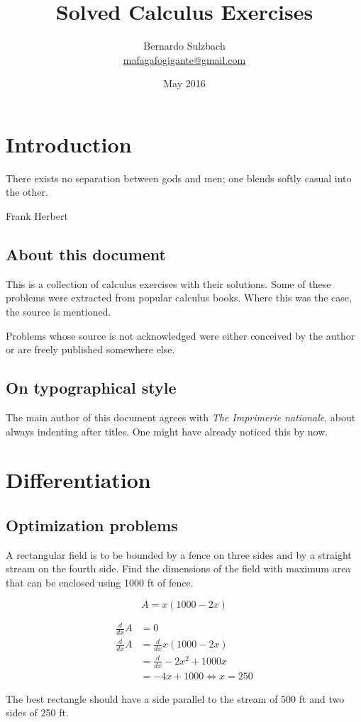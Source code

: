 \documentclass[a4paper, titlepage]{article}
\title{Solved Calculus Exercises}
\author{Bernardo Sulzbach \\
       \href{mailto:mafagafogigante@gmail.com}{mafagafogigante@gmail.com}}
\date{May 2016}
\begin{document}
\maketitle

\tableofcontents

\section{Introduction}

\setlength{\epigraphwidth}{3in}
\epigraph{There exists no separation between gods and men;
one blends softly casual into the other.}{Frank Herbert}

\subsection{About this document}

This is a collection of calculus exercises with their solutions.
Some of these problems were extracted from popular calculus books.
Where this was the case, the source is mentioned.

Problems whose source is not acknowledged were either conceived by
the author or are freely published somewhere else.

\subsection{On typographical style}

The main author of this document agrees with \textit{The Imprimerie nationale},
about always indenting after titles. One might have already noticed this by now.

\section{Differentiation}

\subsection{Optimization problems}

\begin{Exercise}
A rectangular field is to be bounded by a fence on three sides
and by a straight stream on the fourth side.
Find the dimensions of the field with maximum area that can be enclosed
using 1000 ft of fence.
\cite{anton-bivens-davis}
\end{Exercise}

\begin{Answer}
\[A = x \left( 1000 - 2x \right)\]

\begin{align*}
    \frac{d}{dx} A &= 0 \\
    \frac{d}{dx} A &= \frac{d}{dx} x \left( 1000 - 2x \right) \\
    &= \frac{d}{dx} -2x^2 + 1000x \\
    &= -4x + 1000
    \iff x = 250
\end{align*}

The best rectangle should have a side parallel to the stream of 500 ft
and two sides of 250 ft.
\end{Answer}
\end{document}

